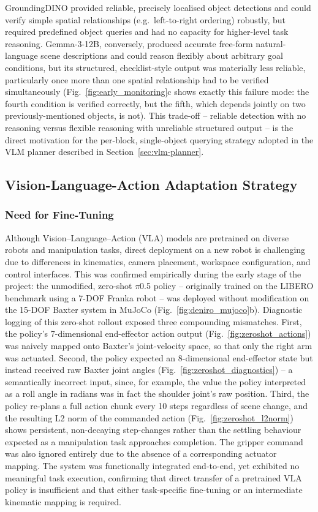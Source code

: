 \documentclass[12pt]{article}
\begin{document}
GroundingDINO provided reliable, precisely localised object detections and could verify simple spatial relationships (e.g.\ left-to-right ordering) robustly, but required predefined object queries and had no capacity for higher-level task reasoning. Gemma-3-12B, conversely, produced accurate free-form natural-language scene descriptions and could reason flexibly about arbitrary goal conditions, but its structured, checklist-style output was materially less reliable, particularly once more than one spatial relationship had to be verified simultaneously (Fig.~\ref{fig:early_monitoring}c shows exactly this failure mode: the fourth condition is verified correctly, but the fifth, which depends jointly on two previously-mentioned objects, is not). This trade-off -- reliable detection with no reasoning versus flexible reasoning with unreliable structured output -- is the direct motivation for the per-block, single-object querying strategy adopted in the VLM planner described in Section~\ref{sec:vlm-planner}.

\subsection{Vision-Language-Action Adaptation Strategy}

\subsubsection{Need for Fine-Tuning}
Although Vision--Language--Action (VLA) models are pretrained on diverse robots and manipulation tasks, direct deployment on a new robot is challenging due to differences in kinematics, camera placement, workspace configuration, and control interfaces. This was confirmed empirically during the early stage of the project: the unmodified, zero-shot $\pi$0.5 policy -- originally trained on the LIBERO benchmark using a 7-DOF Franka robot -- was deployed without modification on the 15-DOF Baxter system in MuJoCo (Fig.~\ref{fig:deniro_mujoco}b). Diagnostic logging of this zero-shot rollout exposed three compounding mismatches. First, the policy's 7-dimensional end-effector action output (Fig.~\ref{fig:zeroshot_actions}) was naively mapped onto Baxter's joint-velocity space, so that only the right arm was actuated. Second, the policy expected an 8-dimensional end-effector state but instead received raw Baxter joint angles (Fig.~\ref{fig:zeroshot_diagnostics}) -- a semantically incorrect input, since, for example, the value the policy interpreted as a roll angle in radians was in fact the shoulder joint's raw position. Third, the policy re-plans a full action chunk every 10 steps regardless of scene change, and the resulting L2 norm of the commanded action (Fig.~\ref{fig:zeroshot_l2norm}) shows persistent, non-decaying step-changes rather than the settling behaviour expected as a manipulation task approaches completion. The gripper command was also ignored entirely due to the absence of a corresponding actuator mapping. The system was functionally integrated end-to-end, yet exhibited no meaningful task execution, confirming that direct transfer of a pretrained VLA policy is insufficient and that either task-specific fine-tuning or an intermediate kinematic mapping is required.
\end{document}
